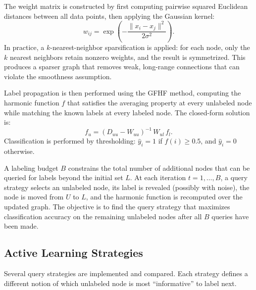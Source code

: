 \documentclass{article}
\begin{document}
The weight matrix is constructed by first computing pairwise squared Euclidean distances between all data points, then applying the Gaussian kernel:
\[
w_{ij} = \exp\!\left(-\frac{\|x_i - x_j\|^2}{2\sigma^2}\right).
\]
In practice, a $k$-nearest-neighbor sparsification is applied: for each node, only the $k$ nearest neighbors retain nonzero weights, and the result is symmetrized. This produces a sparser graph that removes weak, long-range connections that can violate the smoothness assumption.

Label propagation is then performed using the GFHF method, computing the harmonic function $f$ that satisfies the averaging property at every unlabeled node while matching the known labels at every labeled node. The closed-form solution is:
\[
f_u = (D_{uu} - W_{uu})^{-1}\, W_{ul}\, f_l.
\]
Classification is performed by thresholding: $\hat{y}_i = 1$ if $f(i) \geq 0.5$, and $\hat{y}_i = 0$ otherwise.

A labeling budget $B$ constrains the total number of additional nodes that can be queried for labels beyond the initial set $L$. At each iteration $t = 1, \ldots, B$, a query strategy selects an unlabeled node, its label is revealed (possibly with noise), the node is moved from $U$ to $L$, and the harmonic function is recomputed over the updated graph. The objective is to find the query strategy that maximizes classification accuracy on the remaining unlabeled nodes after all $B$ queries have been made.

\subsection{Active Learning Strategies}

Several query strategies are implemented and compared. Each strategy defines a different notion of which unlabeled node is most ``informative'' to label next.
\end{document}
